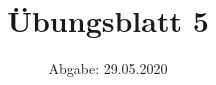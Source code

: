 

\subject{Computational Physics}
\title{Übungsblatt 5}
\date{%
  Abgabe: 29.05.2020
}



\maketitle
\thispagestyle{empty}
\newpage







